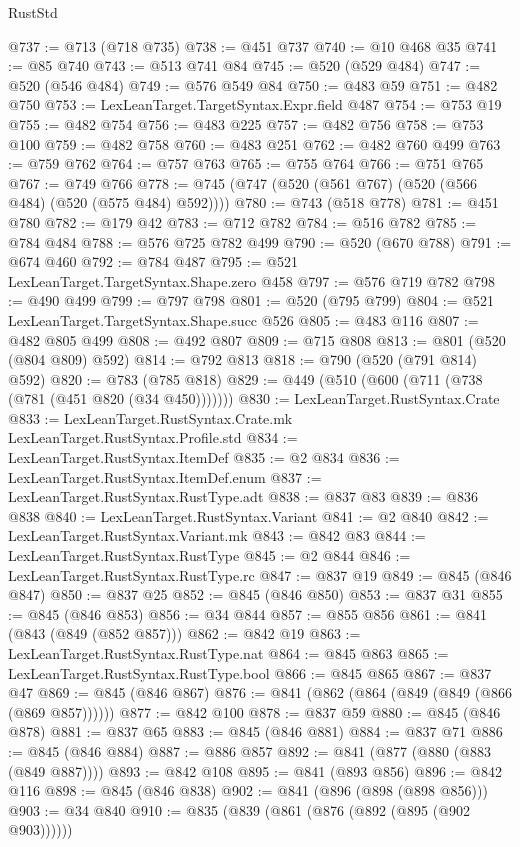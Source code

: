 \begin{lexlean}{RustStd}
\begin{coremodule}
@737 := @713 (@718 @735)
@738 := @451 @737
@740 := @10 @468 @35
@741 := @85 @740
@743 := @513 @741 @84
@745 := @520 (@529 @484)
@747 := @520 (@546 @484)
@749 := @576 @549 @84
@750 := @483 @59
@751 := @482 @750
@753 := LexLeanTarget.TargetSyntax.Expr.field @487
@754 := @753 @19
@755 := @482 @754
@756 := @483 @225
@757 := @482 @756
@758 := @753 @100
@759 := @482 @758
@760 := @483 @251
@762 := @482 @760 @499
@763 := @759 @762
@764 := @757 @763
@765 := @755 @764
@766 := @751 @765
@767 := @749 @766
@778 := @745 (@747 (@520 (@561 @767) (@520 (@566 @484) (@520 (@575 @484) @592))))
@780 := @743 (@518 @778)
@781 := @451 @780
@782 := @179 @42
@783 := @712 @782
@784 := @516 @782
@785 := @784 @484
@788 := @576 @725 @782 @499
@790 := @520 (@670 @788)
@791 := @674 @460
@792 := @784 @487
@795 := @521 LexLeanTarget.TargetSyntax.Shape.zero @458
@797 := @576 @719 @782
@798 := @490 @499
@799 := @797 @798
@801 := @520 (@795 @799)
@804 := @521 LexLeanTarget.TargetSyntax.Shape.succ @526
@805 := @483 @116
@807 := @482 @805 @499
@808 := @492 @807
@809 := @715 @808
@813 := @801 (@520 (@804 @809) @592)
@814 := @792 @813
@818 := @790 (@520 (@791 @814) @592)
@820 := @783 (@785 @818)
@829 := @449 (@510 (@600 (@711 (@738 (@781 (@451 @820 (@34 @450)))))))
@830 := LexLeanTarget.RustSyntax.Crate
@833 := LexLeanTarget.RustSyntax.Crate.mk LexLeanTarget.RustSyntax.Profile.std
@834 := LexLeanTarget.RustSyntax.ItemDef
@835 := @2 @834
@836 := LexLeanTarget.RustSyntax.ItemDef.enum
@837 := LexLeanTarget.RustSyntax.RustType.adt
@838 := @837 @83
@839 := @836 @838
@840 := LexLeanTarget.RustSyntax.Variant
@841 := @2 @840
@842 := LexLeanTarget.RustSyntax.Variant.mk
@843 := @842 @83
@844 := LexLeanTarget.RustSyntax.RustType
@845 := @2 @844
@846 := LexLeanTarget.RustSyntax.RustType.rc
@847 := @837 @19
@849 := @845 (@846 @847)
@850 := @837 @25
@852 := @845 (@846 @850)
@853 := @837 @31
@855 := @845 (@846 @853)
@856 := @34 @844
@857 := @855 @856
@861 := @841 (@843 (@849 (@852 @857)))
@862 := @842 @19
@863 := LexLeanTarget.RustSyntax.RustType.nat
@864 := @845 @863
@865 := LexLeanTarget.RustSyntax.RustType.bool
@866 := @845 @865
@867 := @837 @47
@869 := @845 (@846 @867)
@876 := @841 (@862 (@864 (@849 (@849 (@866 (@869 @857))))))
@877 := @842 @100
@878 := @837 @59
@880 := @845 (@846 @878)
@881 := @837 @65
@883 := @845 (@846 @881)
@884 := @837 @71
@886 := @845 (@846 @884)
@887 := @886 @857
@892 := @841 (@877 (@880 (@883 (@849 @887))))
@893 := @842 @108
@895 := @841 (@893 @856)
@896 := @842 @116
@898 := @845 (@846 @838)
@902 := @841 (@896 (@898 (@898 @856)))
@903 := @34 @840
@910 := @835 (@839 (@861 (@876 (@892 (@895 (@902 @903))))))

\end{coremodule}
\end{lexlean}
